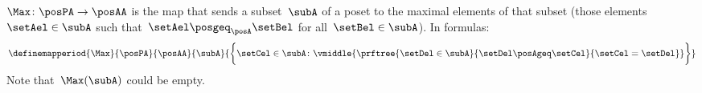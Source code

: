 \begin{ctdefinition}
    \label{def:Max}
    $\Max \colon \posPA \to \posAA$ is the map that sends a subset~$\subA$ of a poset to the maximal elements of that subset (those elements~$\setAel \in \subA$ such that~$\setAel \posgeq_\posA \setBel$ for all~$\setBel \in \subA$).
    In formulas:
    \begin{equation*}
    \definemapperiod{\Max}{\posPA}{\posAA}{\subA}{\bigg\{
                                                                                                                \setCel\in \subA\colon
                                                                                                                \vmiddle{
                                                                                                                    \prftree{
                                                                                                                        \setDel\in \subA
                                                                                                                    }{
                                                                                                                        \setDel\posAgeq \setCel
                                                                                                                    }{
                                                                                                                        \setCel=\setDel
                                                                                                                    }
                                                                                                                }
                                                                                                                \bigg\}}
    \end{equation*}
    Note that~$\Max(\subA)$ could be empty.
\end{ctdefinition}

